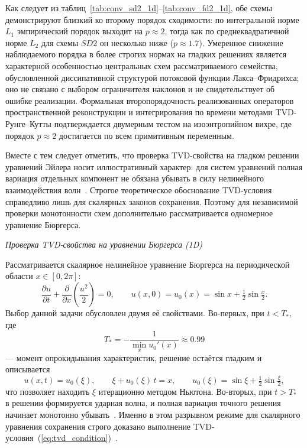 \documentclass[a4paper,14pt]{extarticle}
\theoremstyle{theorem}
\theoremstyle{lemma}
\begin{document}
Как следует из таблиц~\ref{tab:conv_sd2_1d}--\ref{tab:conv_fd2_1d}, обе
схемы демонстрируют близкий ко второму порядок сходимости: по интегральной
норме $L_1$ эмпирический порядок выходит на $p \approx 2$, тогда как по
среднеквадратичной норме $L_2$ для схемы $SD2$ он несколько ниже
($p \approx 1.7$). Умеренное снижение наблюдаемого порядка в более строгих
нормах на гладких решениях является характерной особенностью центральных схем
рассматриваемого семейства, обусловленной диссипативной структурой
потоковой функции Лакса--Фридрихса; оно не связано с выбором ограничителя
наклонов и не свидетельствует об ошибке реализации. Формальная
второпорядочность реализованных операторов пространственной реконструкции и
интегрирования по времени методами TVD-Рунге--Кутты подтверждается
двумерным тестом на изоэнтропийном вихре, где порядок $p \approx 2$ достигается по всем примитивным переменным.

Вместе с тем следует отметить, что проверка TVD-свойства на гладком решении
уравнений Эйлера носит иллюстративный характер: для систем уравнений полная
вариация отдельных компонент не обязана убывать в силу нелинейного взаимодействия
волн~\cite{leveque1992}. Строгое теоретическое обоснование TVD-условия справедливо
лишь для скалярных законов сохранения. Поэтому для независимой проверки
монотонности схем дополнительно рассматривается одномерное уравнение Бюргерса.

\textit{Проверка TVD-свойства на уравнении Бюргерса (1D)}

Рассматривается скалярное нелинейное уравнение Бюргерса на периодической
области $x \in [0, 2\pi]$:
\begin{equation}
    \label{eq:burgers_1d}
    \frac{\partial u}{\partial t} + \frac{\partial}{\partial x}
    \!\left(\frac{u^2}{2}\right) = 0,
    \qquad u(x, 0) = u_0(x) = \sin x + \tfrac{1}{2}\sin\tfrac{x}{2}.
\end{equation}
Выбор данной задачи обусловлен двумя её свойствами. Во-первых, при $t < T_*$,
где 
\begin{equation}
    T_* = -\frac{1}{\min_x u_0'(x)} \approx 0.99
\end{equation}
--- момент опрокидывания
характеристик, решение остаётся гладким и описывается
\begin{equation}
    \label{eq:burgers_exact}
    u(x, t) = u_0(\xi), \qquad \xi + u_0(\xi)\,t = x, \qquad
    u_0(\xi) = \sin\xi + \tfrac{1}{2}\sin\tfrac{\xi}{2},
\end{equation}
что позволяет находить $\xi$ итерационно методом Ньютона. Во-вторых, при
$t > T_*$ в решении формируется ударная волна, и полная вариация точного
решения начинает монотонно убывать~\cite{leveque1992}. Именно в этом
разрывном режиме для скалярного уравнения сохранения строго доказано
выполнение TVD-условия~(\ref{eq:tvd_condition})~\cite{harten1983}.
\end{document}
